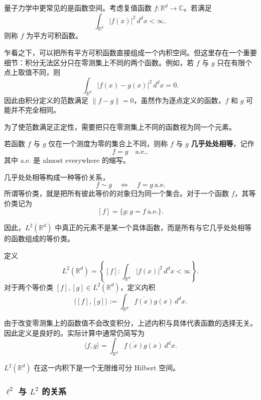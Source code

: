 \documentclass[UTF8,a4paper,11pt,openany]{ctexbook}
\begin{document}
量子力学中更常见的是函数空间。考虑复值函数 $f:\mathbb R^d\to\mathbb C$。若满足
\[
\int_{\mathbb R^d}|f(x)|^2\,d^dx<\infty,
\]
则称 $f$ 为平方可积函数。

乍看之下，可以把所有平方可积函数直接组成一个内积空间。但这里存在一个重要细节：积分无法区分只在零测集上不同的两个函数。例如，若 $f$ 与 $g$ 只在有限个点上取值不同，则
\[
\int_{\mathbb R^d}|f(x)-g(x)|^2\,d^dx=0.
\]
因此由积分定义的范数满足 $\|f-g\|=0$，虽然作为逐点定义的函数，$f$ 和 $g$ 可能并不完全相同。

为了使范数满足正定性，需要把只在零测集上不同的函数视为同一个元素。

\begin{definition}[几乎处处相等]
若函数 $f$ 与 $g$ 仅在一个测度为零的集合上不同，则称 $f$ 与 $g$ \textbf{几乎处处相等}，记作
\[
f=g\quad\text{a.e.},
\]
其中 a.e. 是 almost everywhere 的缩写。
\end{definition}

几乎处处相等构成一种等价关系，
\[
f\sim g
\quad\Longleftrightarrow\quad
f=g\ \text{a.e.}
\]
所谓等价类，就是把所有彼此等价的对象归为同一个集合。对于一个函数 $f$，其等价类记为
\[
[f]
=
\{g:g=f\ \text{a.e.}\}.
\]

因此，$L^2(\mathbb R^d)$ 中真正的元素不是某一个具体函数，而是所有与它几乎处处相等的函数组成的等价类。

\begin{definition}
定义
\begin{equation}
    L^2(\mathbb R^d)
    =
    \left\{
    [f]:
    \int_{\mathbb R^d}|f(x)|^2\,d^dx<\infty
    \right\}.
\end{equation}
对于两个等价类 $[f],[g]\in L^2(\mathbb R^d)$，定义内积
\begin{equation}
    \langle [f],[g]\rangle
    :=
    \int_{\mathbb R^d}
    \overline{f(x)}g(x)\,d^dx.
\end{equation}
\end{definition}

由于改变零测集上的函数值不会改变积分，上述内积与具体代表函数的选择无关。因此定义是良好的。实际计算中通常仍简写为
\[
\langle f,g\rangle
=
\int_{\mathbb R^d}
\overline{f(x)}g(x)\,d^dx.
\]

$L^2(\mathbb R^d)$ 在这一内积下是一个无限维可分 Hilbert 空间。

\subsubsection{$\ell^2$ 与 $L^2$ 的关系}
\end{document}
